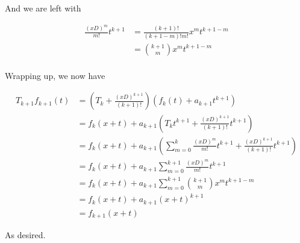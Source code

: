 And we are left with

\begin{align*}
\frac{(xD)^{m}}{m!} t^{k+1} 
&=
\frac{(k+1)!}{(k + 1 - m)!m!} x^m t^{k + 1 -m} \\
&=
\binom{k+1}{m} x^m t^{k + 1 -m} \\
\end{align*}

Wrapping up, we now have

\begin{align*}
T_{k+1} f_{k+1}(t) 
&= 
\left( T_{k} + \frac{(xD)^{k+1}}{(k+1)!} \right) \left( f_{k}(t) + a_{k+1}t^{k+1} \right) \\
&=
f_{k}(x + t) 
+ a_{k+1} 
\left( T_{k} t^{k+1} +\frac{(xD)^{k+1}}{(k+1)!} t^{k+1} \right)
\\
&=
f_{k}(x + t) 
+ a_{k+1} 
\left( 
\sum_{m=0}^k \frac{(xD)^m}{m!} t^{k+1} +\frac{(xD)^{k+1}}{(k+1)!} t^{k+1} \right)
\\
&=
f_{k}(x + t) 
+ a_{k+1} \sum_{m=0}^{k+1} \frac{(xD)^m}{m!} t^{k+1} 
\\
&=
f_{k}(x + t) 
+ a_{k+1} \sum_{m=0}^{k+1} \binom{k+1}{m} x^m t^{k + 1 -m} \\
&=
f_{k}(x + t) + a_{k+1} (x + t)^{k+1} \\
&=
f_{k+1}(x + t) 
\end{align*}

As desired.

%
%

%
